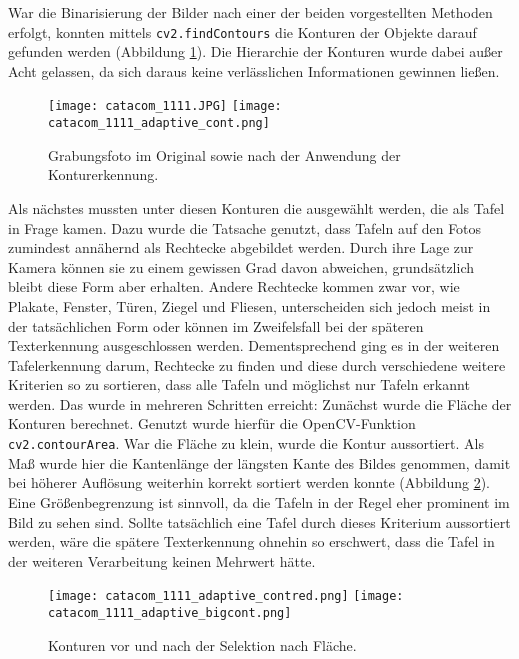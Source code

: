 War die Binarisierung der Bilder nach einer der beiden vorgestellten Methoden erfolgt, konnten mittels \verb|cv2.findContours| die Konturen der Objekte darauf gefunden werden (Abbildung \ref{fig:adaptivecont}). Die Hierarchie der Konturen wurde dabei außer Acht gelassen, da sich daraus keine verlässlichen Informationen gewinnen ließen.
\begin{figure}[h!]
\texttt{[image: catacom\_1111.JPG]}
\texttt{[image: catacom\_1111\_adaptive\_cont.png]}
\caption{Grabungsfoto im Original sowie nach der Anwendung der Konturerkennung.}
\label{fig:adaptivecont}
\end{figure}
Als nächstes mussten unter diesen Konturen die ausgewählt werden, die als Tafel in Frage kamen. Dazu wurde die Tatsache genutzt, dass Tafeln auf den Fotos zumindest annähernd als Rechtecke abgebildet werden. Durch ihre Lage zur Kamera können sie zu einem gewissen Grad davon abweichen, grundsätzlich bleibt diese Form aber erhalten. Andere Rechtecke kommen zwar vor, wie Plakate, Fenster, Türen, Ziegel und Fliesen, unterscheiden sich jedoch meist in der tatsächlichen Form oder können im Zweifelsfall bei der späteren Texterkennung ausgeschlossen werden. Dementsprechend ging es in der weiteren Tafelerkennung darum, Rechtecke zu finden und diese durch verschiedene weitere Kriterien so zu sortieren, dass alle Tafeln und möglichst nur Tafeln erkannt werden. Das wurde in mehreren Schritten erreicht:
Zunächst wurde die Fläche der Konturen berechnet. Genutzt wurde hierfür die OpenCV-Funktion \verb|cv2.contourArea|. War die Fläche zu klein, wurde die Kontur aussortiert. Als Maß wurde hier die Kantenlänge der längsten Kante des Bildes genommen, damit bei höherer Auflösung weiterhin korrekt sortiert werden konnte (Abbildung \ref{fig:adaptivecontsize}). Eine Größenbegrenzung ist sinnvoll, da die Tafeln in der Regel eher prominent im Bild zu sehen sind. Sollte tatsächlich eine Tafel durch dieses Kriterium aussortiert werden, wäre die spätere Texterkennung ohnehin so erschwert, dass die Tafel in der weiteren Verarbeitung keinen Mehrwert hätte.
\begin{figure}[h!]
\texttt{[image: catacom\_1111\_adaptive\_contred.png]}
\texttt{[image: catacom\_1111\_adaptive\_bigcont.png]}
\caption{Konturen vor und nach der Selektion nach Fläche.}
\label{fig:adaptivecontsize}
\end{figure}


